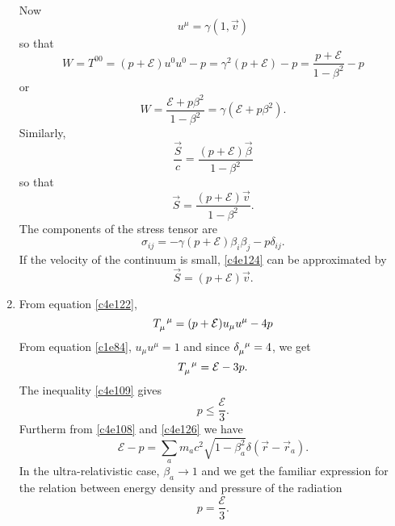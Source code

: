 \begin{enumerate}
Now 
\[
u^\mu = \gamma(1, \vec{v})
\]
so that
\[
W = T^{00} = (p + \mathcal{E})u^0 u^0 - p = \gamma^2(p + \mathcal{E}) - p
= \frac{p + \mathcal{E}}{1 - \beta^2} - p
\]
or
\begin{equation}\label{c4e123}
W = \frac{\mathcal{E} + p\beta^2}{1 - \beta^2} = \gamma(\mathcal{E} + p\beta^2).
\end{equation}
Similarly,
\[
\frac{\vec{S}}{c} = \frac{(p + \mathcal{E})\vec{\beta}}{1 - \beta^2}
\]
so that
\begin{equation}\label{c4e124}
\vec{S} = \frac{(p + \mathcal{E})\vec{v}}{1 - \beta^2}.
\end{equation}
The components of the stress tensor are
\begin{equation}\label{c4e125}
\sigma_{ij} = -\gamma(p + \mathcal{E})\beta_i\beta_j - p\delta_{ij}.
\end{equation}
If the velocity of the continuum is small, \eqref{c4e124} can be approximated by
\begin{equation}
\vec{S} = (p + \mathcal{E})\vec{v}.
\end{equation}

\item From equation \eqref{c4e122},
\[
\tensor{T}{_\mu^\mu} = (p + \mathcal{E})u_\mu u^\mu - 4p
\]
From equation \eqref{c1e84}, $u_\mu u^\mu = 1$ and since $\tensor{\delta}{_\mu^\mu} 
= 4$, we get
\begin{equation}\label{c4e126}
\tensor{T}{_\mu^\mu} = \mathcal{E} - 3p.
\end{equation}
The inequality \eqref{c4e109} gives
\begin{equation}\label{c4e127}
p \le \frac{\mathcal{E}}{3}.
\end{equation}
Furtherm from \eqref{c4e108} and \eqref{c4e126} we have
\begin{equation}\label{c4e128}
\mathcal{E} - p = \sum_a m_ac^2\sqrt{1 - \beta_a^2}\delta(\vec{r} - \vec{r}_a).
\end{equation}
In the ultra-relativistic case, $\beta_a \rightarrow 1$ and we get the familiar
expression for the relation between energy density and pressure of the radiation
\begin{equation}\label{c4e129}
p = \frac{\mathcal{E}}{3}.
\end{equation}

\end{enumerate}

